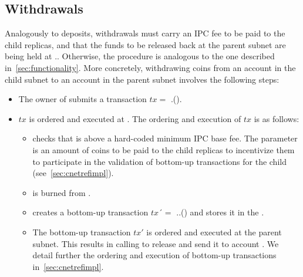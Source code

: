 \subsection{Withdrawals}
Analogously to deposits, withdrawals must carry an IPC fee to be paid to the child replicas, and that the funds to be released back at the parent subnet  are being held at .\gw. Otherwise, the procedure is analogous to the one described in~\cref{sec:functionality}. More concretely, withdrawing  coins from an account  in the child subnet  to an account  in the parent subnet  involves the following steps:
\begin{itemize}
\item The owner of  submits a transaction $tx=$ \gw.().
 \item $tx$ is ordered and executed at . The ordering and execution of $tx$ is as follows:
 \begin{itemize}
        \item \gw checks that  is above a hard-coded minimum IPC base fee. The parameter  is an amount of coins to be paid to the child replicas to incentivize them to participate in the validation of bottom-up transactions for the child (see~\cref{sec:cnetrefimpl}). 
        \item {} is burned from .
        \item \gw creates a bottom-up transaction $tx´=$ ..() and stores it in the \bqueue.
        \item The bottom-up transaction $tx'$ is ordered and executed at the parent subnet. This results in  calling \gw to release  and send it to account . We detail further the ordering and execution of bottom-up transactions in~\cref{sec:cnetrefimpl}.
    \end{itemize}
\end{itemize}


